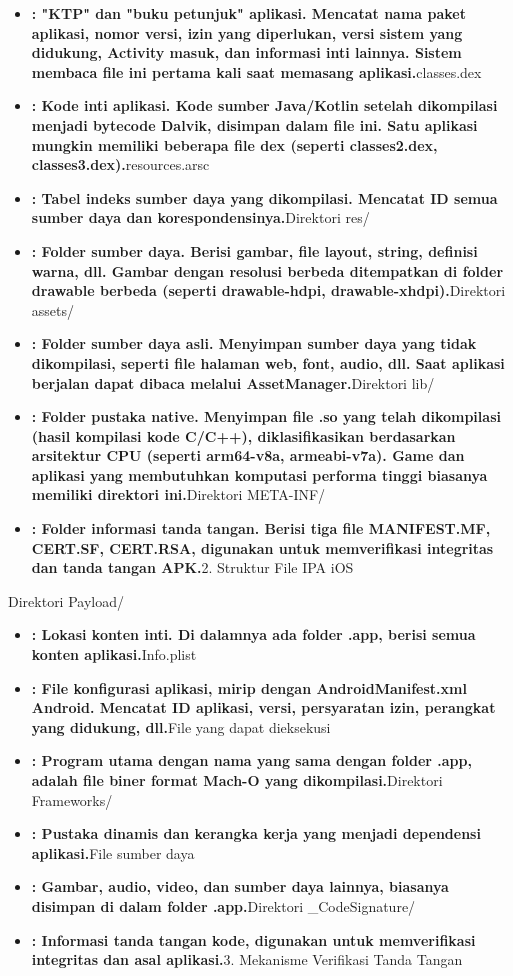 \begin{itemize}
  \item \textbf{: "KTP" dan "buku petunjuk" aplikasi. Mencatat nama paket aplikasi, nomor versi, izin yang diperlukan, versi sistem yang didukung, Activity masuk, dan informasi inti lainnya. Sistem membaca file ini pertama kali saat memasang aplikasi.}classes.dex
  \item \textbf{: Kode inti aplikasi. Kode sumber Java/Kotlin setelah dikompilasi menjadi bytecode Dalvik, disimpan dalam file ini. Satu aplikasi mungkin memiliki beberapa file dex (seperti classes2.dex, classes3.dex).}resources.arsc
  \item \textbf{: Tabel indeks sumber daya yang dikompilasi. Mencatat ID semua sumber daya dan korespondensinya.}Direktori res/
  \item \textbf{: Folder sumber daya. Berisi gambar, file layout, string, definisi warna, dll. Gambar dengan resolusi berbeda ditempatkan di folder drawable berbeda (seperti drawable-hdpi, drawable-xhdpi).}Direktori assets/
  \item \textbf{: Folder sumber daya asli. Menyimpan sumber daya yang tidak dikompilasi, seperti file halaman web, font, audio, dll. Saat aplikasi berjalan dapat dibaca melalui AssetManager.}Direktori lib/
  \item \textbf{: Folder pustaka native. Menyimpan file .so yang telah dikompilasi (hasil kompilasi kode C/C++), diklasifikasikan berdasarkan arsitektur CPU (seperti arm64-v8a, armeabi-v7a). Game dan aplikasi yang membutuhkan komputasi performa tinggi biasanya memiliki direktori ini.}Direktori META-INF/
  \item \textbf{: Folder informasi tanda tangan. Berisi tiga file MANIFEST.MF, CERT.SF, CERT.RSA, digunakan untuk memverifikasi integritas dan tanda tangan APK.}2. Struktur File IPA iOS
\end{itemize}


Direktori Payload/

\begin{itemize}
  \item \textbf{: Lokasi konten inti. Di dalamnya ada folder .app, berisi semua konten aplikasi.}Info.plist
  \item \textbf{: File konfigurasi aplikasi, mirip dengan AndroidManifest.xml Android. Mencatat ID aplikasi, versi, persyaratan izin, perangkat yang didukung, dll.}File yang dapat dieksekusi
  \item \textbf{: Program utama dengan nama yang sama dengan folder .app, adalah file biner format Mach-O yang dikompilasi.}Direktori Frameworks/
  \item \textbf{: Pustaka dinamis dan kerangka kerja yang menjadi dependensi aplikasi.}File sumber daya
  \item \textbf{: Gambar, audio, video, dan sumber daya lainnya, biasanya disimpan di dalam folder .app.}Direktori \_CodeSignature/
  \item \textbf{: Informasi tanda tangan kode, digunakan untuk memverifikasi integritas dan asal aplikasi.}3. Mekanisme Verifikasi Tanda Tangan
\end{itemize}

